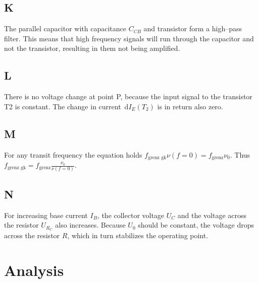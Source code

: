 \documentclass[a4paper,10pt]{article}
\newcommand{\td}{\,\text{d}}
\numberwithin{equation}{section}
\begin{document}
\begin{multicols}{2}
	\subsection{K}
        The parallel capacitor with capacitance $C_{CB}$ and transistor form a high--pass filter.
        This means that high frequency signals will run through the capacitor and not the transistor, resulting in them not being amplified.

	\subsection{L}
        There is no voltage change at point P, because the input signal to the transistor T2 is constant.
        The change in current $\td I_E\left(T_2\right)$ is in return also zero.

	\subsection{M}
        For any transit frequency the equation holds $f_\text{grenz gk}\nu\left(f=0\right)=f_\text{grenz}\nu_0$.
	Thus $f_\text{grenz gk}=f_\text{grenz}\tfrac{\nu_0}{\nu\left(f=0\right)}$.

	\subsection{N}
        For increasing base current $I_B$, the collector voltage $U_C$ and the voltage across the resistor $U_{R_C}$ also increases.
        Because $U_0$ should be constant, the voltage drops across the resistor $R$, which in turn stabilizes the operating point.

	\clearpage
	\section{Analysis}

\end{multicols}
\end{document}
